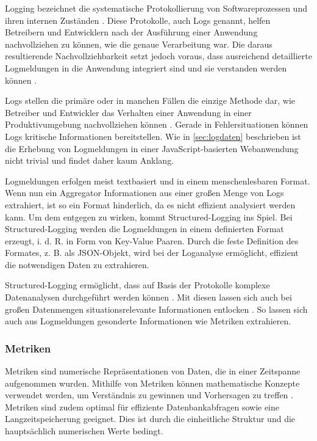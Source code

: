 Logging bezeichnet die systematische Protokollierung von Softwareprozessen und ihren internen Zuständen \cite{LearningToLog}. Diese Protokolle, auch Logs genannt, helfen Betreibern und Entwicklern nach der Ausführung einer Anwendung nachvollziehen zu können, wie die genaue Verarbeitung war. Die daraus resultierende Nachvollziehbarkeit setzt jedoch voraus, dass ausreichend detaillierte Logmeldungen in die Anwendung integriert sind und sie verstanden werden können \cite{LearningToLog}.

Logs stellen die primäre oder in manchen Fällen die einzige Methode dar, wie Betreiber und Entwickler das Verhalten einer Anwendung in einer Produktivumgebung nachvollziehen können  \cite{EventLogsForTheAnalysisOfSoftwareFailures} \cite{LearningToLog}. Gerade in Fehlersituationen können Logs kritische Informationen bereitstellen. Wie in \autoref{sec:logdaten} beschrieben ist die Erhebung von Logmeldungen in einer JavaScript-basierten Webanwendung nicht trivial und findet daher kaum Anklang.

Logmeldungen erfolgen meist textbasiert und in einem menschenlesbaren Format. Wenn nun ein Aggregator Informationen aus einer großen Menge von Logs extrahiert, ist so ein Format hinderlich, da es nicht effizient analysiert werden kann. Um dem entgegen zu wirken, kommt Structured-Logging ins Spiel. Bei Structured-Logging \cite{StructuredAndInteroperableLogging} werden die Logmeldungen in einem definierten Format erzeugt, i. d. R. in Form von Key-Value Paaren. Durch die feste Definition des Formates, z. B. als JSON-Objekt, wird bei der Loganalyse ermöglicht, effizient die notwendigen Daten zu extrahieren.

Structured-Logging ermöglicht, dass auf Basis der Protokolle komplexe Datenanalysen durchgeführt werden können \cite{StructuredAndInteroperableLogging}. Mit diesen lassen sich auch bei großen Datenmengen situationsrelevante Informationen entlocken \cite{StructuredLoggingCraftingUsefulMessageContent}. So lassen sich auch aus Logmeldungen gesonderte Informationen wie Metriken extrahieren.

\subsubsection{Metriken}

Metriken sind numerische Repräsentationen von Daten, die in einer Zeitspanne aufgenommen wurden. Mithilfe von Metriken können mathematische Konzepte verwendet werden, um Verständnis zu gewinnen und Vorhersagen zu treffen \cite{DistributedSystemsObservability}. Metriken sind zudem optimal für effiziente Datenbankabfragen sowie eine Langzeitspeicherung geeignet. Dies ist durch die einheitliche Struktur und die hauptsächlich numerischen Werte bedingt.

